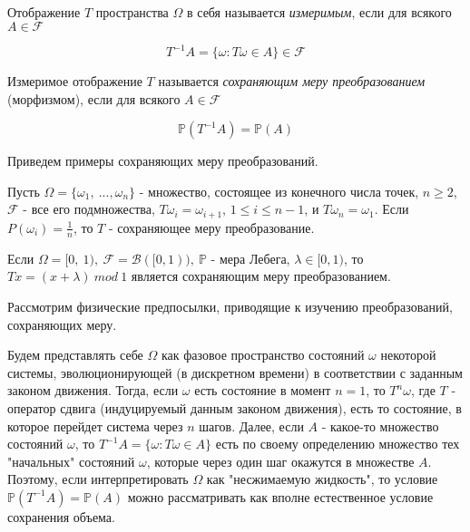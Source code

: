 \begin{definition} Отображение $T$ пространства $\Omega$ в себя называется \textit{измеримым}, если для всякого $A \in \mathscr{F}$

{\centering 
\begin{equation}
T^{-1}A = \{\omega: T\omega \in A\} \in \mathscr{F}
\end{equation}
}
\end{definition}

\begin{definition} Измеримое отображение $T$ называется \textit{сохраняющим меру преобразованием} (морфизмом), если для всякого $A \in \mathscr{F}$

{\centering 
\begin{equation}
\mathbb{P}(T^{-1}A) = \mathbb{P}(A)
\end{equation}
}
\end{definition}

Приведем примеры сохраняющих меру преобразований.

\begin{example} Пусть $\Omega = \{\omega_1, ~..., \omega_n\}$ - множество, состоящее из конечного числа точек, $n \geq 2$, $\mathscr{F}$ - все его подмножества, $T\omega_i = \omega_{i+1}$, $1 \leq i \leq n - 1$, и $T\omega_n = \omega_1$. Если $P(\omega_i) = \frac{1}{n}$, то $T$ - сохраняющее меру преобразование.
\end{example}

\begin{example} Если $\Omega = [0, ~1), ~\mathscr{F} = \mathscr{B}([0, 1)), ~\mathbb{P}$ - мера Лебега, $\lambda \in [0, 1)$, то $Tx = (x + \lambda) ~mod ~1$ является сохраняющим меру преобразованием.
\end{example}

Рассмотрим физические предпосылки, приводящие к изучению преобразований, сохраняющих меру.

Будем представлять себе $\Omega$ как фазовое пространство состояний $\omega$ некоторой системы, эволюционирующей (в дискретном времени) в соответствии с заданным законом движения. Тогда, если $\omega$ есть состояние в момент $n = 1$, то $T^n\omega$, где $T$ - оператор сдвига (индуцируемый данным законом движения), есть то состояние, в которое перейдет система через $n$ шагов. Далее, если $A$ - какое-то множество состояний $\omega$, то $T^{-1}A = \{\omega: T\omega \in A\}$ есть по своему определению множество тех "начальных"  состояний $\omega$, которые через один шаг окажутся в множестве $A$. Поэтому, если интерпретировать $\Omega$ как "несжимаемую жидкость", то условие $\mathbb{P}(T^{-1}A) = \mathbb{P}(A)$ можно рассматривать как вполне естественное условие сохранения объема.

